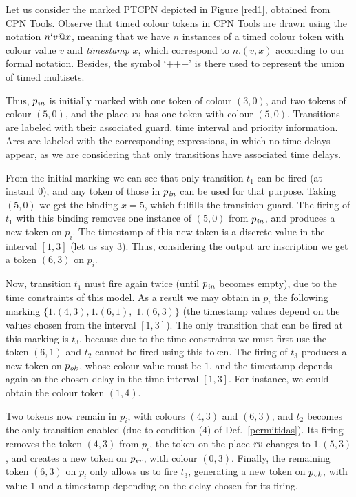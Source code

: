 \begin{example} Let us consider the marked PTCPN depicted in Figure \ref{red1}, 
obtained from CPN Tools. 
% 
Observe that timed colour tokens in CPN Tools are drawn
using the notation $n`v@x$,
meaning that we have $n$ instances of a timed colour token 
with colour value $v$ and {\em timestamp} $x$, which correspond to $n.(v,x)$
according to our formal notation. Besides, the symbol `+++'
is there used to represent the union of timed
multisets. 

Thus, $p_{\it in}$ is initially marked with one token
of colour $(3,0)$, and two tokens of colour $(5,0)$,
and the place ${\it rv}$ has one token with colour
$(5,0)$.  Transitions are labeled
with their associated guard, time interval and priority
information. 
Arcs are labeled with the corresponding expressions,
in which no time delays appear, as we are considering
that only transitions have associated time delays.

From the initial marking we can see that
only transition $t_1$ can be fired (at instant $0$), and
any token of those in $p_{\it in}$ can be used for
that purpose.  Taking $(5,0)$ we get the binding $x=5$,
which fulfills the transition guard.
The firing of $t_1$ with this binding removes
one instance of $(5,0)$ from $p_{\it in}$,
and produces a new token on $p_i$.
The timestamp of this new token is a discrete value
in the interval $[1,3]$ (let us say $3$).
Thus, considering the output
arc inscription we get a token $(6,3)$  on $p_i$.

Now, transition $t_1$ must fire again twice (until $p_{\it in}$ 
becomes empty), due to the time constraints of this model. 
As a result we may obtain in $p_i$ the following marking
$\{1.(4,3), 1.(6,1),$
$ 1.(6,3)\}$ (the timestamp values depend on the values
chosen from the interval $[1,3]$).
% 
The only transition that can be fired at this marking
is $t_3$, because due to the time constraints 
we must first use the token $(6,1)$
and $t_2$ cannot be fired using this token.
The firing of $t_3$ produces a new token on $p_{\it ok}$,
whose colour value must be $1$, and the timestamp
depends again on the chosen delay in the time interval
$[1,3]$. For instance, we could obtain the 
colour token $(1,4)$. 

Two tokens now remain in $p_i$, with colours  $(4,3)$ and 
$(6,3)$, and $t_2$ becomes the only transition
enabled (due to condition (4) of Def.\ \ref{permitidas}).
Its firing removes the token $(4,3)$ from $p_i$,
the token on the place ${\it rv}$ changes to $1.(5,3)$,  
and creates a new token on $p_{\it er}$, with colour $(0,3)$. 
%
% 
Finally, the remaining token $(6,3)$ on $p_i$ 
only allows us to fire $t_3$, generating a new token
on $p_{\it ok}$, with value $1$ and a timestamp
depending on the delay chosen for its firing.
\end{example}


